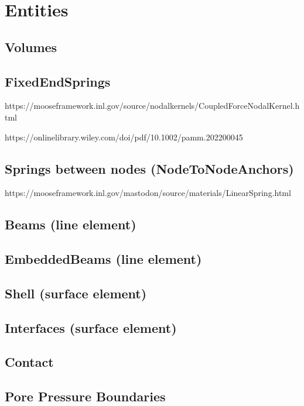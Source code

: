 \section{Entities}

\subsection{Volumes}
\label{chap:entities-volume}

\subsection{FixedEndSprings}
\label{chap:entities-fixed-end-springs}

https://mooseframework.inl.gov/source/nodalkernels/CoupledForceNodalKernel.html

https://onlinelibrary.wiley.com/doi/pdf/10.1002/pamm.202200045

\subsection{Springs between nodes (NodeToNodeAnchors)}
\label{chap:entities-springs}

https://mooseframework.inl.gov/mastodon/source/materials/LinearSpring.html

\subsection{Beams (line element)}
\label{chap:entities-beams}

\subsection{EmbeddedBeams (line element)}
\label{chap:entities-embedded-beams}

\subsection{Shell (surface element)}
\label{chap:entities-shell}

\subsection{Interfaces (surface element)}

\subsection{Contact}

\subsection{Pore Pressure Boundaries}
